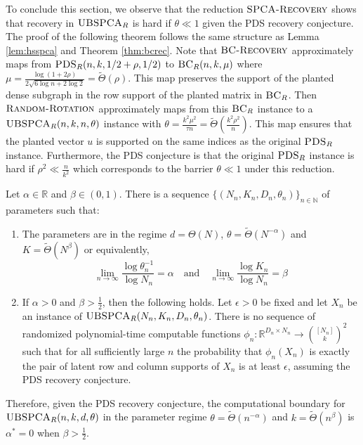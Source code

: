 To conclude this section, we observe that the reduction $\textsc{SPCA-Recovery}$ shows that recovery in $\textsc{UBSPCA}_R$ is hard if $\theta \ll 1$ given the PDS recovery conjecture. The proof of the following theorem follows the same structure as Lemma \ref{lem:hsspca} and Theorem \ref{thm:bcrec}. Note that $\textsc{BC-Recovery}$ approximately maps from $\textsc{PDS}_R(n, k, 1/2 + \rho, 1/2)$ to $\textsc{BC}_R(n, k, \mu)$ where $\mu = \frac{\log (1 + 2\rho)}{2 \sqrt{6 \log n + 2\log 2}} = \tilde{\Theta}(\rho)$. This map preserves the support of the planted dense subgraph in the row support of the planted matrix in $\textsc{BC}_R$. Then $\textsc{Random-Rotation}$ approximately maps from this $\textsc{BC}_R$ instance to a $\textsc{UBSPCA}_R(n, k, n, \theta)$ instance with $\theta = \frac{k^2 \mu^2}{\tau n} = \tilde{\Theta}\left( \frac{k^2 \rho^2}{n} \right)$. This map ensures that the planted vector $u$ is supported on the same indices as the original $\textsc{PDS}_R$ instance. Furthermore, the PDS conjecture is that the original $\textsc{PDS}_R$ instance is hard if $\rho^2 \ll \frac{n}{k^2}$ which corresponds to the barrier $\theta \ll 1$ under this reduction.

\begin{theorem} \label{thm:spcarec}
Let $\alpha \in \mathbb{R}$ and $\beta \in (0, 1)$. There is a sequence $\{ (N_n, K_n, D_n, \theta_n) \}_{n \in \mathbb{N}}$ of parameters such that:
\begin{enumerate}
\item The parameters are in the regime $d = \Theta(N)$, $\theta = \tilde{\Theta}(N^{-\alpha})$ and $K = \tilde{\Theta}(N^\beta)$ or equivalently,
$$\lim_{n \to \infty} \frac{\log \theta_n^{-1}}{\log N_n} = \alpha \quad \text{and} \quad \lim_{n \to \infty} \frac{\log K_n}{\log N_n} = \beta$$
\item If $\alpha > 0$ and $\beta > \frac{1}{2}$, then the following holds. Let $\epsilon > 0$ be fixed and let $X_n$ be an instance of $\textsc{UBSPCA}_R(N_n, K_n, D_n, \theta_n)$. There is no sequence of randomized polynomial-time computable functions $\phi_n : \mathbb{R}^{D_n \times N_n} \to \binom{[N_n]}{k}^2$ such that for all sufficiently large $n$ the probability that $\phi_n(X_n)$ is exactly the pair of latent row and column supports of $X_n$ is at least $\epsilon$, assuming the PDS recovery conjecture.
\end{enumerate}
Therefore, given the PDS recovery conjecture, the computational boundary for $\textsc{UBSPCA}_R(n, k, d, \theta)$ in the parameter regime $\theta = \tilde{\Theta}(n^{-\alpha})$ and $k = \tilde{\Theta}(n^\beta)$ is $\alpha^* = 0$ when $\beta > \frac{1}{2}$.
\end{theorem}

